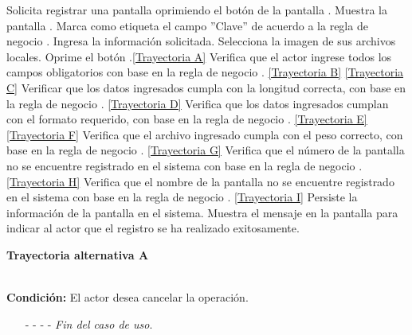 	\begin{UCtrayectoria}
		\UCpaso[\UCactor] Solicita registrar una pantalla oprimiendo el botón  de la pantalla .
		\UCpaso[\UCsist] Muestra la pantalla . \label{CU11.1-P5}
		\UCpaso[\UCsist] Marca como etiqueta el campo ''Clave'' de acuerdo a la regla de negocio .
		\UCpaso[\UCactor] Ingresa la información solicitada. \label{CU11.1-P3}
		\UCpaso[\UCactor] Selecciona la imagen de sus archivos locales. \label{CU11.1-P4} 
		\UCpaso[\UCactor] Oprime el botón .\hyperlink{CU11-1:TAA}{[Trayectoria A]}
		\UCpaso[\UCsist] Verifica que el actor ingrese todos los campos obligatorios con base en la regla de negocio . \hyperlink{CU11-1:TAB}{[Trayectoria B]} \hyperlink{CU11-1:TAC}{[Trayectoria C]}
		\UCpaso[\UCsist] Verificar que los datos ingresados cumpla con la longitud correcta, con base en la regla de negocio . \hyperlink{CU11-1:TAD}{[Trayectoria D]}
		\UCpaso[\UCsist] Verifica que los datos ingresados cumplan con el formato requerido, con base en la regla de negocio . \hyperlink{CU11-1:TAE}{[Trayectoria E]} \hyperlink{CU11-1:TAF}{[Trayectoria F]}
		\UCpaso[\UCsist] Verifica que el archivo ingresado cumpla con el peso correcto, con base en la regla de negocio . \hyperlink{CU11-1:TAG}{[Trayectoria G]}
		\UCpaso[\UCsist] Verifica que el número de la pantalla no se encuentre registrado en el sistema con base en la regla de negocio . \hyperlink{CU11-1:TAH}{[Trayectoria H]}
		\UCpaso[\UCsist] Verifica que el nombre de la pantalla no se encuentre registrado en el sistema con base en la regla de negocio . \hyperlink{CU11-1:TAI}{[Trayectoria I]}
		\UCpaso[\UCsist] Persiste la información de la pantalla en el sistema.
		\UCpaso[\UCsist] Muestra el mensaje  en la pantalla  para indicar al actor que el registro se ha realizado exitosamente.
	\end{UCtrayectoria}		
\hypertarget{CU11-1:TAA}{\textbf{Trayectoria alternativa A}}\\
\noindent \textbf{Condición:} El actor desea cancelar la operación.
\begin{enumerate}
	\UCpaso[\UCactor] Solicita cancelar la operación oprimiendo el botón  de la pantalla .
	\UCpaso[\UCsist] Muestra la pantalla .
	\item[- -] - - {\em {Fin del caso de uso}}.%
\end{enumerate}
